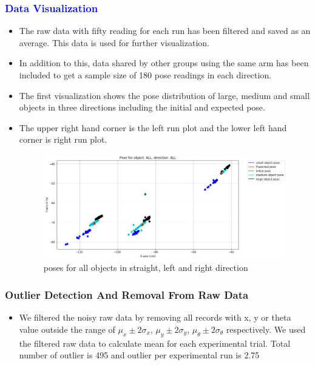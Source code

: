\documentclass[10pt,a4paper]{article}
\begin{document}
						 \subsubsection{\textcolor{blue}{Data Visualization}}
						\begin{itemize}
							\item The raw data with fifty reading for each run has been filtered and saved as an average. This data is used for further visualization. 
							\item In addition to this, data shared by other groups using the same arm has been included to get a sample size of 180 pose readings in each direction.
							\item The first visualization shows the pose distribution of large, medium and small objects in three directions including the initial and expected pose. 
							\item The upper right hand corner is the left run plot and the lower left hand corner is right run plot.
							\begin{figure}[h]
								\centering
								\includegraphics[width=1.0\linewidth]{img/pose_all_all.png}
								\caption{poses for all objects in straight, left and right direction}
								\label{fig:poses for all objects in straight, left and right direction}
							\end{figure}
					\end{itemize}			
	    				 \subsubsection{Outlier Detection And Removal From Raw Data}
	    				 \begin{itemize}
	    				 	\item We filtered the noisy raw data by removing all records with x, y or theta value outside the range of $\mu_x \pm 2\sigma_x$, $\mu_y \pm 2\sigma_y$, $\mu_\theta \pm 2\sigma_\theta$ respectively. We used the filtered raw data to calculate mean for each experimental trial. Total number of outlier is 495 and outlier per experimental run is 2.75
	    				 \end{itemize}
		    				 
\end{document}
